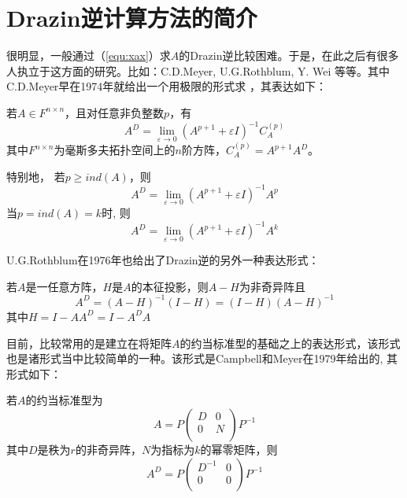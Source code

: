 \section{Drazin逆计算方法的简介}
很明显，一般通过（\ref{equ:xax}）求$A$的Drazin逆比较困难。于是，在此之后有很多人执立于这方面的研究。比如：C.\nbs D.\nbs Meyer, U.\nbs G.\nbs Rothblum, Y. Wei 等等。其中C.\nbs D.\nbs Meyer早在1974年就给出一个用极限的形式求 ，其表达如下：\par
若$A\in F^{n\times n}$，且对任意非负整数$p$，有
\begin{equation}
  A^D=\lim_{\varepsilon\rightarrow 0}(A^{p+1}+\varepsilon I)^{-1}C^{(p)}_A
\end{equation}
其中$F^{n\times n}$为毫斯多夫拓扑空间上的$n$阶方阵，$C^{(p)}_A=A^{p+1}A^D$。\par
特别地， 若$p\geq ind(A)$，则
\begin{equation*}
  A^D=\lim_{\varepsilon\rightarrow 0}(A^{p+1}+\varepsilon I)^{-1}A^p
\end{equation*}
当$p=ind(A)=k$时, 则
\begin{equation*}
  A^D=\lim_{\varepsilon\rightarrow 0}(A^{p+1}+\varepsilon I)^{-1}A^k
\end{equation*}\par
U.\nbs G.\nbs Rothblum在1976年也给出了Drazin逆的另外一种表达形式：\par
若$A$是一任意方阵，$H$是$A$的本征投影，则$A-H$为非奇异阵且
\begin{equation}
  A^D=(A-H)^{-1}(I-H)=(I-H)(A-H)^{-1}
\end{equation}
其中$H=I-AA^D=I-A^DA$\par
目前，比较常用的是建立在将矩阵$A$的约当标准型的基础之上的表达形式，该形式也是诸形式当中比较简单的一种。该形式是Campbell和Meyer在1979年给出的, 其形式如下：\par
若$A$的约当标准型为
\begin{equation*}
  A=P\left(
       \begin{array}{cc}
         D & 0 \\
         0 & N \\
       \end{array}
     \right)
  P^{-1}
\end{equation*}
其中$D$是秩为$r$的非奇异阵，$N$为指标为$k$的幂零矩阵，则
\begin{equation}
  A^D=P\left(
       \begin{array}{cc}
         D^{-1} & 0 \\
         0 & 0 \\
       \end{array}
     \right)
  P^{-1}
\end{equation}\par
